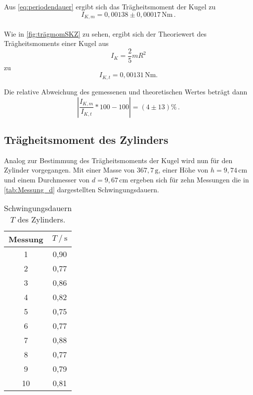 Aus \eqref{eq:periodendauer} ergibt sich das Trägheitsmoment der Kugel zu
\begin{equation*}
  I_{K,m} = 0,00138 \pm 0,00017\, \unit{\newton\meter}  \, .
\end{equation*} \\

Wie in \autoref{fig:trägmomSKZ} zu sehen, ergibt sich der Theoriewert des Trägheitsmoments einer Kugel aus
\begin{equation}
  I_{K} = \frac{2}{5} m R^2
  \label{trägheitsmomK}
\end{equation}
zu
\begin{equation*}
  I_{K,t} = 0,00131 \, \unit{\newton\meter}. %
\end{equation*}

Die relative Abweichung des gemessenen und theoretischen Wertes beträgt dann
\begin{equation*}
  \left|\frac{I_{K,m}}{I_{K,t}} * 100 - 100 \right| = (4 \pm 13) \% \,. %
\end{equation*}



\subsection{Trägheitsmoment des Zylinders}
\label{subsec:d}

Analog zur Bestimmung des Trägheitsmoments der Kugel wird nun für den Zylinder vorgegangen. Mit einer Masse von $367,7 \,\unit{\gram}$, einer Höhe von $h = 9,74 \,\unit{\centi\meter}$
und einem Durchmesser von $d = 9,67 \,\unit{\centi\meter}$ ergeben sich für zehn Messungen die in \autoref{tab:Messung_d} dargestellten Schwingungsdauern.

\begin{table}[H] %
  \centering
  \begin{tabular}{S[table-format=2.0] S[table-format=1.2]}
      \toprule
      {Messung} & {$T \mathbin{/} \unit{\second}$}\\
        & 0,90 \\
          2  & 0,77 \\
          3  & 0,86 \\
          4  & 0,82 \\  
          5  & 0,75 \\
          6  & 0,77 \\
          7  & 0,88 \\
          8  & 0,77 \\
          9  & 0,79 \\
          10 & 0,81 \\
      \bottomrule
  \end{tabular}
  \caption{Schwingungsdauern $T$ des Zylinders.}
  \label{tab:Messung_d}
\end{table}

